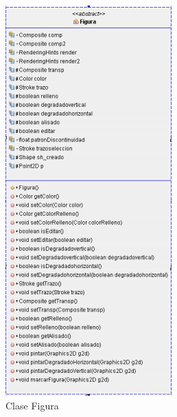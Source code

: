 \begin{figure}[H]
  \centering
    \includegraphics[scale=0.75]{images/figura2}
  \caption{Clase Figura}
  \label{Clases Figura}
\end{figure}
